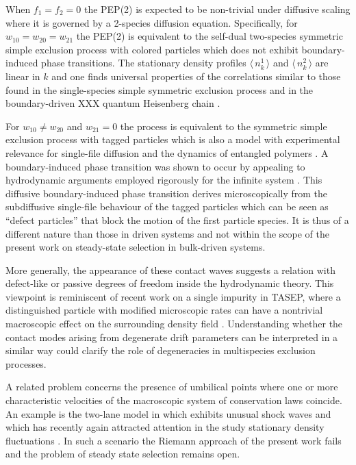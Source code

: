 \documentclass[12pt]{article}
\newcommand{\exval}[1]{\mbox{$\langle \, {#1}\, \rangle$}}
\begin{document}
When $f_1=f_2=0$ %
the PEP(2) is expected to be non-trivial under diffusive scaling
where it is governed by a 2-species diffusion equation. Specifically, for $w_{10}=w_{20}=w_{21}$ the PEP(2) is equivalent to the self-dual
two-species symmetric simple exclusion process with colored particles \cite{Schu94,Giar09,Sa25}
which does not exhibit boundary-induced phase transitions.
The stationary density profiles $\exval{n^1_k}$ and $\exval{n^2_k}$ 
are linear in $k$ and one finds universal properties of the correlations
\cite{Cari13,Casi24} similar to
those found in the single-species simple symmetric exclusion process 
\cite{Spoh83,Derr93a,Flor23}
and in the boundary-driven XXX quantum Heisenberg chain \cite{Pros11,Popk13,Buca16}. 

For $w_{10}\neq w_{20}$ and $w_{21}=0$
the process is equivalent to the symmetric simple exclusion process with
tagged particles \cite{Arra83,Quas92} which is also a model with experimental relevance for single-file diffusion   \cite{Kukl96,Wei00} and the
dynamics of entangled polymers 
\cite{Perk94,Bark96,Schu99}.
A boundary-induced phase transition was shown to occur \cite{Brza07}
by appealing to hydrodynamic arguments employed rigorously for the infinite
system \cite{Quas92}. This diffusive boundary-induced
phase transition derives microscopically from the subdiffusive single-file behaviour of the tagged particles \cite{Arra83} which can be seen as ``defect particles'' that block the motion of the first particle species. It is thus
of a different nature than those in driven systems and
not within the scope of the present work on steady-state selection in bulk-driven systems.

More generally, the
appearance of these contact waves suggests a relation with defect-like or
passive degrees of freedom inside the hydrodynamic theory. This viewpoint
is reminiscent of recent work on a single impurity in TASEP, where a
distinguished particle with modified microscopic rates can have a
nontrivial macroscopic effect on the surrounding density field
\cite{CantZah25}. Understanding whether the contact modes arising from
degenerate drift parameters can be interpreted in a similar way could
clarify the role of degeneracies in multispecies exclusion processes.

A related problem concerns the presence of umbilical points where one or
more characteristic velocities of the macroscopic system of conservation
laws coincide. An example is the two-lane model in \cite{Popk12} which exhibits unusual shock waves and which has recently again attracted attention in the study stationary density fluctuations \cite{Roy25,Spoh26}. In such a scenario the 
Riemann approach of the present work fails and the problem
of steady state selection remains open.
\end{document}
